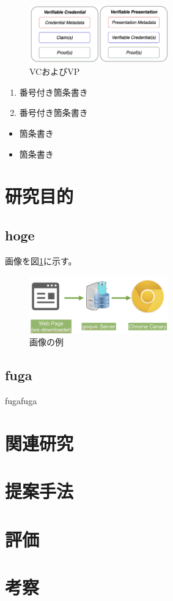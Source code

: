 \documentclass[10pt]{ltjsarticle}
\begin{document}
\begin{figure}[htbp]
    \begin{center}
        \includegraphics[width=6cm]{assets/VCとVP.png}
        \caption{VCおよびVP}
    \end{center}
\end{figure}

\begin{enumerate}
\item 番号付き箇条書き 
\item 番号付き箇条書き
\end{enumerate}

\begin{itemize}
\item 箇条書き
\item 箇条書き
\end{itemize}


\section{研究目的}

\subsection{hoge}
画像を図\ref{sample}に示す。

\begin{figure}[htbp]
    \begin{center}
        \includegraphics[width=6cm]{assets/figure1.png}
        \caption{画像の例}
        \label{sample}
    \end{center}
\end{figure}
 
\subsection{fuga}
fugafuga

\section{関連研究}

\section{提案手法}

\section{評価}

\section{考察}



\end{document}
